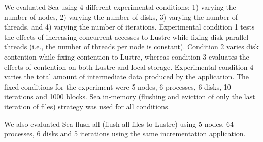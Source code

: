 \documentclass[10pt,journal,compsoc]{IEEEtran}
\begin{document}
                                                                                   
      We evaluated Sea using 4 different experimental conditions: 1) varying the
      number of nodes, 2) varying the number of disks, 3) varying the number of
      threads, and 4) varying the number of iterations. Experimental condition 1
      tests the effects of increasing concurrent accesses to Lustre while fixing
      disk parallel threads (i.e., the number of threads per node is constant).
      Condition 2 varies disk contention while fixing
      contention to Lustre, whereas condition 3 evaluates the effects of contention on both
      Lustre and local storage. Experimental condition 4 varies the total amount
      of intermediate data produced by the application. The fixed conditions for
      the experiment were 5 nodes, 6 processes, 6 disks, 10 iterations and 1000
      blocks. Sea in-memory (flushing and eviction of only the last iteration of
      files) strategy was used for all conditions.
      
      We also evaluated Sea flush-all (flush all files to Lustre) using 5 nodes,
      64 processes, 6 disks and 5 iterations using the same incrementation
      application.
\end{document}
